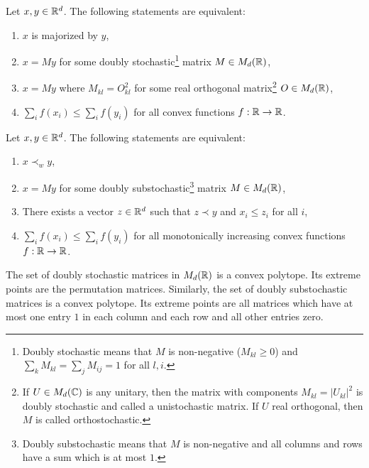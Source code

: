 \documentclass[11pt,a4paper]{article}
\theoremstyle{plain}
\theoremstyle{definition}
\theoremstyle{remark}
\begin{document}
\begin{theorem}[Majorization]
    Let $x,y\in\mathbb{R}^d$. The following statements are equivalent:
    \begin{enumerate}
        \item $x$ is majorized by $y$,
        \item $x=My$ for some doubly stochastic\footnote{Doubly stochastic means that $M$ is non-negative ($M_{kl}\ge 0$) and
                  $\sum_k M_{kl}=\sum_j M_{ij}=1$ for all $l,i$.} matrix $M\in M_d(\mathbb{R})$,
        \item $x=My$ where $M_{kl}=O_{kl}^2$ for some real orthogonal matrix\footnote{If $U\in M_d(\mathbb{C})$ is any unitary, then the matrix with components $M_{kl}=|U_{kl}|^2$
                  is doubly stochastic and called a unistochastic matrix. If $U$ real orthogonal, then $M$ is called orthostochastic.} $O\in M_d(\mathbb{R})$,
        \item $\sum_i f(x_i)\le \sum_i f(y_i)$ for all convex functions $f:\mathbb{R}\to\mathbb{R}$.
    \end{enumerate}
\end{theorem}

\begin{theorem}[Submajorization]
    Let $x,y\in\mathbb{R}^d$. The following statements are equivalent:
    \begin{enumerate}
        \item $x\prec_w y$,
        \item $x=My$ for some doubly substochastic\footnote{Doubly substochastic means that $M$ is non-negative and all columns and rows have a sum which is at most $1$.}
              matrix $M\in M_d(\mathbb{R})$,
        \item There exists a vector $z\in\mathbb{R}^d$ such that $z\prec y$ and $x_i\le z_i$ for all $i$,
        \item $\sum_i f(x_i)\le \sum_i f(y_i)$ for all monotonically increasing convex functions $f:\mathbb{R}\to\mathbb{R}$.
    \end{enumerate}
\end{theorem}

\begin{theorem}[Birkhoff]
    The set of doubly stochastic matrices in $M_d(\mathbb{R})$ is a convex polytope. Its extreme points are the permutation matrices. Similarly, the set of doubly substochastic matrices is a convex polytope.
    Its extreme points are all matrices which have at most one entry $1$ in each column and each row and all other entries zero.
\end{theorem}
\end{document}
